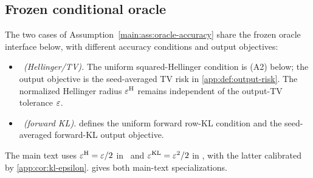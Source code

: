 \begin{samepage}
\subsection{Frozen conditional oracle}
\label{app:setup-oracle}

The two cases of Assumption~\ref{main:ass:oracle-accuracy} share the frozen oracle
interface below, with different accuracy conditions and output objectives:
\begin{itemize}
 \item \emph{\HellingerCaseTitle\ (Hellinger/TV).}
 The uniform squared-Hellinger condition is (A2) below; the output objective
 is the seed-averaged TV risk in \textcolor{red}{\cref{app:def:output-risk}}.
 The normalized Hellinger radius $\varepsilon^{\mathrm H}$ remains independent
 of the output-TV tolerance $\varepsilon$.
 \item \emph{\KLCaseTitle\ (forward KL).}
  defines the uniform forward row-KL
 condition and the seed-averaged forward-KL output objective.
\end{itemize}
\end{samepage}
The main text uses $\varepsilon^{\mathrm H}=\varepsilon/2$ in \HellingerCase\
and $\varepsilon^{\mathrm{KL}}=\varepsilon^2/2$ in \KLCase, with the latter
calibrated by \cref{app:cor:kl-epsilon}.
 gives both main-text specializations.

